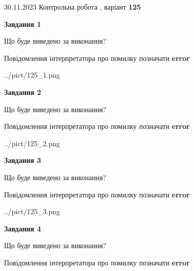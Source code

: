 \documentclass[12pt, ukrainian]{article}
\begin{document}
{{30.11.2023 Контрольна робота , варіант  \No \textbf { 125 }\par}}
{




{\begin {center}\textbf{Завдання 1}\end {center}}\par
Що буде виведено за виконання? \par
Повідомлення інтерпретатора про помилку позначати \textbf{error}

\begin{center}
	{../pict/125_1.png}
\end{center}
\newpage

{\begin {center}\textbf{Завдання 2}\end {center}}\par
Що буде виведено за виконання? \par
Повідомлення інтерпретатора про помилку позначати \textbf{error}

\begin{center}
	{../pict/125_2.png}
\end{center}
\newpage

{\begin {center}\textbf{Завдання 3}\end {center}}\par
Що буде виведено за виконання? \par
Повідомлення інтерпретатора про помилку позначати \textbf{error}

\begin{center}
	{../pict/125_3.png}
\end{center}
\newpage

{\begin {center}\textbf{Завдання 4}\end {center}}\par
Що буде виведено за виконання? \par
Повідомлення інтерпретатора про помилку позначати \textbf{error}

}
\end{document}
